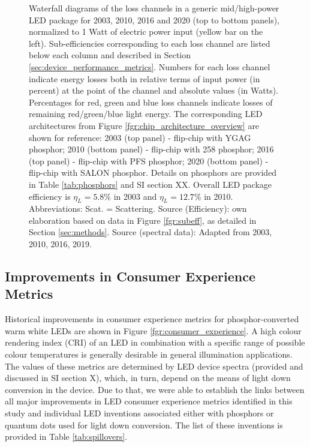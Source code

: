 \documentclass[twoside,twocolumn,9pt]{article}
\begin{document}
\begin{figure}[h!]
 \caption{Waterfall diagrams of the loss channels in a generic mid/high-power LED package for 2003, 2010, 2016 and 2020 (top to bottom panels), normalized to 1 Watt of electric power input (yellow bar on the left). Sub-efficiencies corresponding to each loss channel are listed below each column and described in Section \ref{sec:device_performance_metrics}. Numbers for each loss channel indicate energy losses both in relative terms of input power (in percent) at the point of the channel and absolute values (in Watts). Percentages for red, green and blue loss channels indicate losses of remaining red/green/blue light energy. The corresponding LED architectures from Figure \ref{fgr:chip_architecture_overview} are shown for reference: 2003 (top panel) - flip-chip with YGAG phosphor; 2010 (bottom panel) - flip-chip with 258 phosphor; 2016 (top panel) - flip-chip with PFS phosphor; 2020 (bottom panel) - flip-chip with SALON phosphor. Details on phosphors are provided in Table \ref{tab:phosphors} and SI section XX. Overall LED package efficiency is $\eta_L = 5.8\%$ in 2003 and $\eta_L = 12.7\%$ in 2010. Abbreviations: Scat. = Scattering. Source (Efficiency): own elaboration based on data in Figure \ref{fgr:subeff}, as detailed in Section \ref{sec:methods}. Source (spectral data): Adapted from 2003\cite{Mueller2002}, 2010\cite{MuellerMach2005}, 2016\cite{Murphy2015}, 2019\cite{Hoerder2019}.}
 \label{fgr:waterfall}
\end{figure}

\subsection{Improvements in Consumer Experience Metrics}

Historical improvements in consumer experience metrics for phosphor-converted warm white LEDs are shown in Figure \ref{fgr:consumer_experience}. A high colour rendering index (CRI) of an LED in combination with a specific range of possible colour temperatures is generally desirable in general illumination applications. The values of these metrics are determined by LED device spectra (provided and discussed in SI section X), which, in turn, depend on the means of light down conversion in the device. Due to that, we were able to establish the links between all major improvements in LED consumer experience metrics identified in this study and individual LED inventions associated either with phosphors or quantum dots used for light down conversion. The list of these inventions is provided in Table \ref{tab:spillovers}. 
\end{document}
